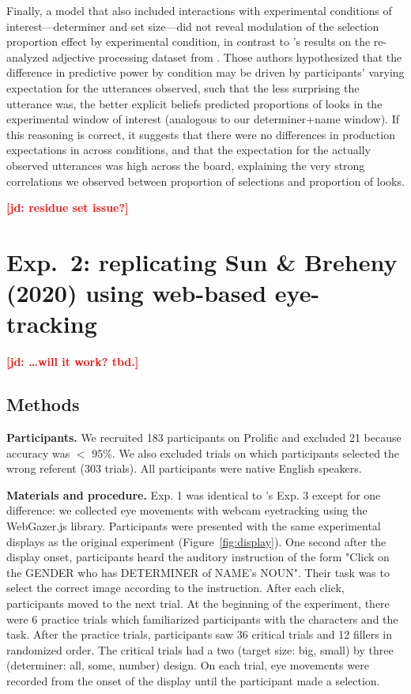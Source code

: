 \documentclass[10pt,letterpaper]{article}
\newcommand{\figref}[1]{Figure~\ref{#1}}
\newcommand{\jd}[1]{\textcolor{Red}{\textbf{[jd: #1]}}}
\begin{document}
Finally, a model that also included interactions with experimental conditions of interest---determiner and set size---did not reveal modulation of the selection proportion effect by experimental condition, in contrast to 's results on the re-analyzed adjective processing dataset from . Those authors hypothesized that the difference in predictive power by condition may be driven by participants' varying expectation for the utterances observed, such that the less surprising the utterance was, the better explicit beliefs predicted proportions of looks in the experimental window of interest (analogous to our determiner+name window). If this reasoning is correct, it suggests that there were no differences in production expectations in  across conditions, and that the expectation for the actually observed utterances was high across the board, explaining the very strong correlations we observed between proportion of selections and proportion of looks.

\jd{residue set issue?}

\section{Exp.~2: replicating Sun \& Breheny (2020) using web-based eye-tracking}

\jd{\dots will it work? tbd.}

\subsection{Methods}

\textbf{Participants.} We recruited 183 participants on Prolific and excluded 21  because  accuracy was $<$ 95\%. We also excluded trials on which participants selected the wrong referent (303 trials). All participants were native English speakers.


\textbf{Materials and procedure.} Exp. 1 was identical to 's Exp. 3 except for one difference: we collected eye movements with webcam eyetracking using the WebGazer.js \cite{papoutsaki2016webgazer} library. Participants were presented with the same experimental displays as the original experiment (\figref{fig:display}). One second after the display onset, participants heard the auditory instruction of the form "Click on the GENDER who has DETERMINER of NAME's NOUN". Their task was to select the correct image according to the instruction. After each click, participants moved to the next trial. At the beginning of the experiment, there were 6 practice trials which familiarized participants with the characters and the task. After the practice trials, participants saw 36 critical trials and 12 fillers in randomized order. The critical trials had a two (target size: big, small) by three (determiner: all, some, number) design. On each trial, eye movements were recorded from the onset of the display until the participant made a selection.
\end{document}
